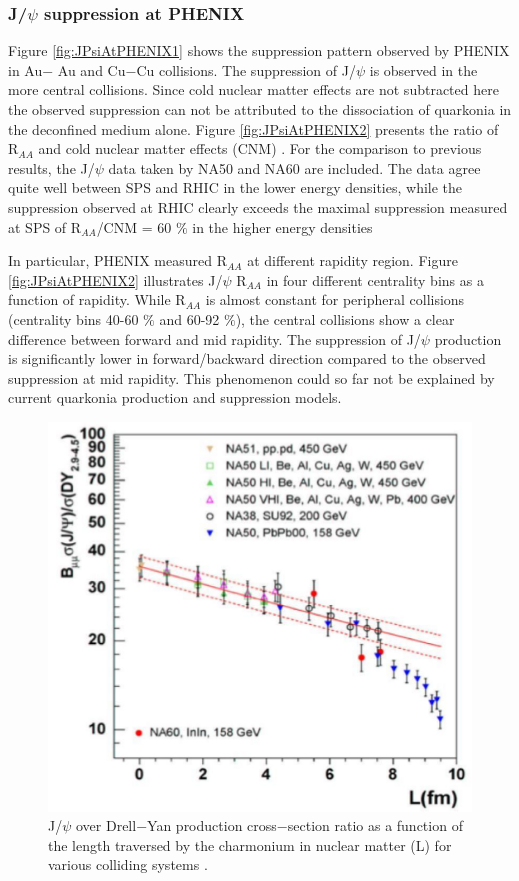 \subsubsection{J/$\psi$ suppression at PHENIX}
Figure \ref{fig:JPsiAtPHENIX1} shows the suppression pattern observed by PHENIX in Au$-$
Au and Cu$-$Cu collisions. The suppression of J/$\psi$  is observed in the more
central collisions. Since cold nuclear matter effects are not subtracted here the
observed suppression can not be attributed to the dissociation of quarkonia in
the deconfined medium alone. Figure \ref{fig:JPsiAtPHENIX2} presents the ratio of R$_{AA}$ and cold
nuclear matter effects (CNM) \cite{Phenix1}. For the comparison to previous results, the
J/$\psi$  data taken by NA50 and NA60 are included. The data agree quite well
between SPS and RHIC in the lower energy densities, while the suppression
observed at RHIC clearly exceeds the maximal suppression measured at SPS
of R$_{AA}$/CNM = 60 $\%$ in the higher energy densities

In particular, PHENIX measured R$_{AA}$ at different rapidity region. 
Figure \ref{fig:JPsiAtPHENIX2} illustrates J/$\psi$  R$_{AA}$ in four different centrality bins 
as a function of rapidity. While R$_{AA}$ is almost constant for peripheral collisions 
(centrality bins 40-60 $\%$ and 60-92 $\%$), the central collisions show a clear 
difference between forward and mid rapidity. The suppression of J/$\psi$  production is 
significantly lower in forward/backward direction compared to the observed suppression
at mid rapidity. This phenomenon could so far not be explained by current
quarkonia production and suppression models.


\begin{figure}
  \includegraphics[width=\largefigwidth]{chap_QuarkoniaSurvey_figures/SPSNA51_27}
  \caption[JPsiAtSPSCrossSection]{J/$\psi$ over Drell$-$Yan production cross$-$section ratio as a function
of the length traversed by the charmonium in nuclear matter (L) for various colliding systems \cite{Pillot}.}
   \label{fig:JPsiAtSPS}
\end{figure}


